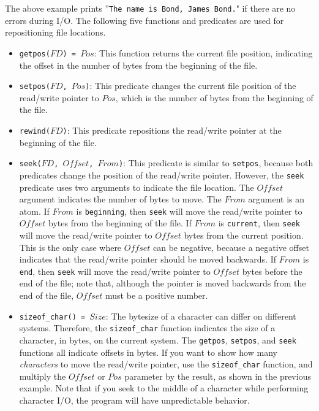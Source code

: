 {The above example prints ''\texttt{The name is Bond, James Bond.}" if there are no errors during I/O.  The following five functions and predicates are used for repositioning file locations.
\begin{itemize}
\item \texttt{getpos($FD$) = $Pos$}: This function returns the current file position, indicating the offset in the number of bytes from the beginning of the file.
\item \texttt{setpos($FD$, $Pos$)}: This predicate changes the current file position of the read/write pointer to $Pos$, which is the number of bytes from the beginning of the file.
\item \texttt{rewind($FD$)}: This predicate repositions the read/write pointer at the beginning of the file.
\item \texttt{seek($FD$, $Offset$, $From$)}: This predicate is similar to \texttt{setpos}, because both predicates change the position of the read/write pointer.  However, the \texttt{seek} predicate uses two arguments to indicate the file location.  The $Offset$ argument indicates the number of bytes to move.  The $From$ argument is an atom.  If $From$ is \texttt{beginning}, then \texttt{seek} will move the read/write pointer to $Offset$ bytes from the beginning of the file.  If $From$ is \texttt{current}, then \texttt{seek} will move the read/write pointer to $Offset$ bytes from the current position.  This is the only case where $Offset$ can be negative, because a negative offset indicates that the read/write pointer should be moved backwards.  If $From$ is \texttt{end}, then \texttt{seek} will move the read/write pointer to $Offset$ bytes before the end of the file; note that, although the pointer is moved backwards from the end of the file, $Offset$ must be a positive number.  
\item \texttt{sizeof\_char() = $Size$}: The bytesize of a character can differ on different systems.  Therefore, the \texttt{sizeof\_char} function indicates the size of a character, in bytes, on the current system.  The \texttt{getpos}, \texttt{setpos}, and \texttt{seek} functions all indicate offsets in bytes.  If you want to show how many \emph{characters} to move the read/write pointer, use the \texttt{sizeof\_char} function, and multiply the $Offset$ or $Pos$ parameter by the result, as shown in the previous example.  Note that if you seek to the middle of a character while performing character I/O, the program will have unpredictable behavior.    

\end{itemize}}
